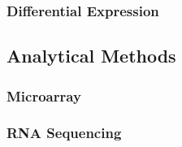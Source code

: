 \subsubsection{Differential Expression}


\subsection{Analytical Methods}

\subsubsection{Microarray}

\subsubsection{RNA Sequencing}


